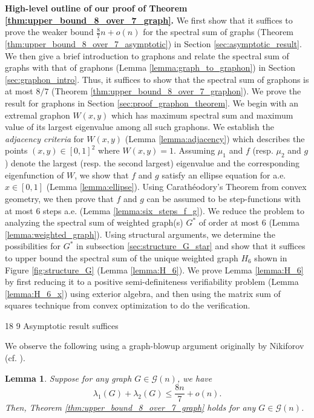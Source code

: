 \documentclass[11pt]{article}
\makeatletter
\renewcommand\section{\@startsection{section}{1}{\z@}%
{18\p@ \@plus 6\p@ \@minus 3\p@}%
{9\p@ \@plus 6\p@ \@minus 3\p@}%
{\large\bfseries\boldmath}}
\theoremstyle{plain}
\newtheorem{lemma}[theorem]{Lemma}
\theoremstyle{definition}
\numberwithin{equation}{section}
\makeatother
\begin{document}
\noindent \textbf{High-level outline of our proof of Theorem \ref{thm:upper_bound_8_over_7_graph}.} We first 
show that it suffices to prove the weaker bound $\frac{8}{7}n + o(n)$ for the spectral sum of 
graphs (Theorem \ref{thm:upper_bound_8_over_7_asymptotic}) in Section \ref{sec:asymptotic_result}. 
We then give a brief introduction to graphons and relate the spectral sum of graphs with that of 
graphons (Lemma \ref{lemma:graph_to_graphon}) in Section \ref{sec:graphon_intro}. Thus, it suffices 
to show that the spectral sum of graphons is at most $8/7$ (Theorem \ref{thm:upper_bound_8_over_7_graphon}). 
We prove the result for graphons in Section \ref{sec:proof_graphon_theorem}. We begin with an 
extremal graphon $W(x,y)$ which has maximum spectral sum and maximum value of its largest eigenvalue 
among all such graphons. We establish the \emph{adjacency criteria} for $W(x,y)$ (Lemma \ref{lemma:adjacency}) which describes 
the points $(x,y)\in [0,1]^2$ where $W(x,y)=1$. Assuming $\mu_1$ and $f$ (resp. $\mu_2$ and $g$) 
denote the largest (resp. the second largest) eigenvalue and the corresponding eigenfunction of $W$, 
we show that $f$ and $g$ satisfy an ellipse equation for a.e. $x\in [0,1]$ (Lemma \ref{lemma:ellipse}). 
Using Carath\'{e}odory's Theorem from convex geometry, we then prove that $f$ and $g$ can be assumed 
to be step-functions with at most $6$ steps a.e. (Lemma \ref{lemma:six_steps_f_g}). We reduce 
the problem to analyzing the spectral sum of weighted graph(s) $G^*$ of order at most $6$ 
(Lemma \ref{lemma:weighted_graph}). Using structural arguments, we determine the possibilities 
for $G^*$ in subsection \ref{sec:structure_G_star} and show that it suffices to upper bound the 
spectral sum of the unique weighted graph $H_6$ shown in Figure \ref{fig:structure_G} (Lemma \ref{lemma:H_6}). 
We prove Lemma \ref{lemma:H_6} by first reducing it to a positive semi-definiteness verifiability 
problem (Lemma \ref{lemma:H_6_x}) using exterior algebra, and then using the matrix sum of squares 
technique from convex optimization to do the verification.  

\section{Asymptotic result suffices} 
\label{sec:asymptotic_result}

We observe the following using a graph-blowup argument originally by Nikiforov (cf. \cite{Csikvari_2009}). 

\begin{lemma}
Suppose for any graph $G\in \mathcal{G}(n)$, we have 
\[
\lambda_1(G) + \lambda_2(G) \le \frac{8n}{7} + o(n).    
\]
Then, Theorem \ref{thm:upper_bound_8_over_7_graph} holds for any $G\in \mathcal{G}(n)$.
\end{lemma}
\end{document}
